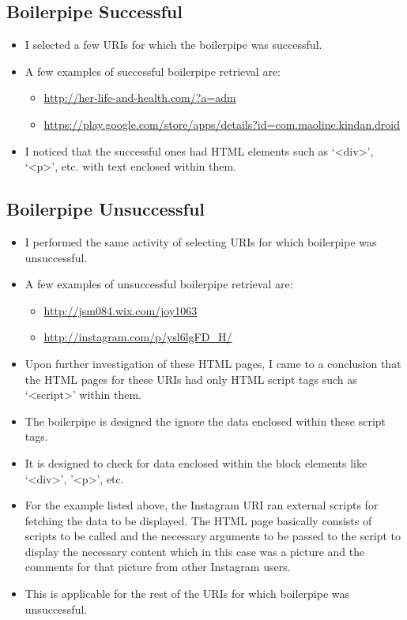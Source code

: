 \subsection{Boilerpipe Successful}
\begin{itemize}
\item I selected a few URIs for which the boilerpipe was successful.
\item A few examples of successful boilerpipe retrieval are:
	\begin{itemize}
	\item \url{http://her-life-and-health.com/?a=adm}
	\item \url{https://play.google.com/store/apps/details?id=com.maoline.kindan.droid}
	\end{itemize}
\item I noticed that the successful ones had HTML elements such as `<div>', `<p>', etc. with text enclosed within them.
\end{itemize}

\subsection{Boilerpipe Unsuccessful}
\begin{itemize}
\item I performed the same activity of selecting URIs for which boilerpipe was unsuccessful.
\item A few examples of unsuccessful boilerpipe retrieval are:
	\begin{itemize}
	\item \url{http://jsm084.wix.com/joy1063}
	\item \url{http://instagram.com/p/ysl6lgFD_H/}
	\end{itemize}
\item Upon further investigation of these HTML pages, I came to a conclusion that the HTML pages for these URIs had only HTML script tags such as `<script>' within them.
\item The boilerpipe is designed the ignore the data enclosed within these script tags.
\item It is designed to check for data enclosed within the block elements like `<div>', '<p>', etc.
\item For the example listed above, the Instagram URI ran external scripts for fetching the data to be displayed. The HTML page basically consists of scripts to be called and the necessary arguments to be passed to the script to display the necessary content which in this case was a picture and the comments for that picture from other Instagram users.
\item This is applicable for the rest of the URIs for which boilerpipe was unsuccessful.
\end{itemize}

